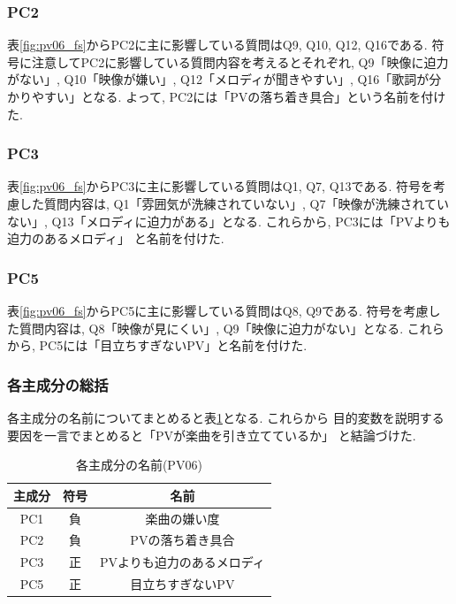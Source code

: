 \documentclass[12pt, a4j]{jsarticle}
\begin{document}
      \subsubsection{PC2}
        表\ref{fig:pv06_fs}からPC2に主に影響している質問はQ9, Q10, Q12, Q16である. 
        符号に注意してPC2に影響している質問内容を考えるとそれぞれ, Q9「映像に迫力がない」,
        Q10「映像が嫌い」, Q12「メロディが聞きやすい」, Q16「歌詞が分かりやすい」となる. 
        よって, PC2には「PVの落ち着き具合」という名前を付けた. 

      \subsubsection{PC3}
        表\ref{fig:pv06_fs}からPC3に主に影響している質問はQ1, Q7, Q13である. 
        符号を考慮した質問内容は, Q1「雰囲気が洗練されていない」, Q7「映像が洗練されていない」, 
        Q13「メロディに迫力がある」となる. これらから, PC3には「PVよりも迫力のあるメロディ」
        と名前を付けた. 
      
      \subsubsection{PC5}
        表\ref{fig:pv06_fs}からPC5に主に影響している質問はQ8, Q9である. 
        符号を考慮した質問内容は, Q8「映像が見にくい」, Q9「映像に迫力がない」となる. 
        これらから, PC5には「目立ちすぎないPV」と名前を付けた. 

      \subsubsection{各主成分の総括}
        各主成分の名前についてまとめると表\ref{fig:names}となる. これらから
        目的変数を説明する要因を一言でまとめると「PVが楽曲を引き立てているか」
        と結論づけた. 

        \begin{table}
          \centering
          \caption{各主成分の名前(PV06)}
          \begin{tabular}{|c|c|c|} \hline 
            主成分 & 符号 & 名前 \\ \hline \hline 
            PC1 & 負 & 楽曲の嫌い度 \\ \hline
            PC2 & 負 & PVの落ち着き具合 \\ \hline
            PC3 & 正 & PVよりも迫力のあるメロディ \\ \hline
            PC5 & 正 & 目立ちすぎないPV \\ \hline
          \end{tabular}
          \label{fig:names}
        \end{table}
\end{document}
